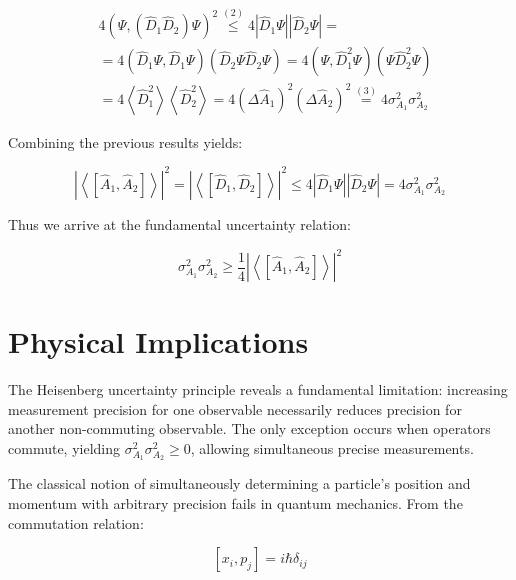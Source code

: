\begin{align}
& 4\left(\Psi,\left(\hat{D}_{1} \hat{D}_{2}\right) \Psi\right)^{2} \stackrel{(2)}{\leq} 4\left|\hat{D}_{1} \Psi\right|\left|\hat{D}_{2} \Psi\right|= \\
& =4\left(\hat{D}_{1} \Psi, \hat{D}_{1} \Psi\right)\left(\hat{D}_{2} \Psi \hat{D}_{2} \Psi\right)=4\left(\Psi, \hat{D}_{1}^{2} \Psi\right)\left(\Psi \hat{D}_{2}^{2} \Psi\right)  \\
& =4\left\langle\hat{D}_{1}^{2}\right\rangle\left\langle\hat{D}_{2}^{2}\right\rangle=4\left(\Delta \hat{A}_{1}\right)^{2}\left(\Delta \hat{A}_{2}\right)^{2} \stackrel{(3)}{=} 4 \sigma_{A_{1}}^{2} \sigma_{A_{2}}^{2}
\end{align}

Combining the previous results yields:

\begin{equation}
\left|\left\langle\left[\hat{A}_{1}, \hat{A}_{2}\right]\right\rangle\right|^{2}=\left|\left\langle\left[\hat{D}_{1}, \hat{D}_{2}\right]\right\rangle\right|^{2} \leq 4\left|\hat{D}_{1} \Psi\right|\left|\hat{D}_{2} \Psi\right|=4 \sigma_{A_{1}}^{2} \sigma_{A_{2}}^{2}
\end{equation}

Thus we arrive at the fundamental uncertainty relation:

\begin{equation}
\sigma_{A_{1}}^{2} \sigma_{A_{2}}^{2} \geq \frac{1}{4}\left|\left\langle\left[\hat{A}_{1}, \hat{A}_{2}\right]\right\rangle\right|^{2}
\end{equation}

\section{Physical Implications}
The Heisenberg uncertainty principle reveals a fundamental limitation: increasing measurement precision for one observable necessarily reduces precision for another non-commuting observable. The only exception occurs when operators commute, yielding $\sigma_{A_{1}}^{2} \sigma_{A_{2}}^{2} \geq 0$, allowing simultaneous precise measurements.

The classical notion of simultaneously determining a particle's position and momentum with arbitrary precision fails in quantum mechanics. From the commutation relation:

\begin{equation}
\left[x_{i}, p_{j}\right]=i \hbar \delta_{i j}
\end{equation}

